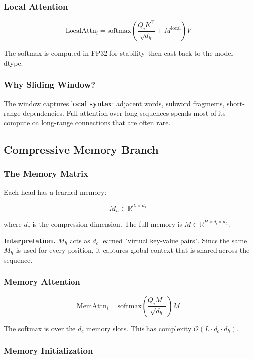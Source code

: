 \subsubsection{Local Attention}

\[
\text{LocalAttn}_i = \text{softmax}\!\left(\frac{Q_i K^\top}{\sqrt{d_h}} + M^\text{local}\right) V
\tag{4.3}
\]

The softmax is computed in FP32 for stability, then cast back to the model 
dtype.

\subsubsection{Why Sliding Window?}

The window captures \textbf{local syntax}: adjacent words, subword fragments, 
short-range dependencies. Full attention over long sequences spends most 
of its compute on long-range connections that are often rare.

\subsection{Compressive Memory Branch}

\subsubsection{The Memory Matrix}

Each head has a learned memory:

\[
M_h \in \mathbb{R}^{d_c \times d_h}
\tag{4.4}
\]

where $d_c$ is the compression dimension. The full memory is 
$M \in \mathbb{R}^{H \times d_c \times d_h}$.

\textbf{Interpretation.} $M_h$ acts as $d_c$ learned "virtual key-value pairs". 
Since the same $M_h$ is used for every position, it captures global context 
that is shared across the sequence.

\subsubsection{Memory Attention}

\[
\text{MemAttn}_i = \text{softmax}\!\left(\frac{Q_i M^\top}{\sqrt{d_h}}\right) M
\tag{4.5}
\]

The softmax is over the $d_c$ memory slots. This has complexity 
$\mathcal{O}(L \cdot d_c \cdot d_h)$.

\subsubsection{Memory Initialization}

